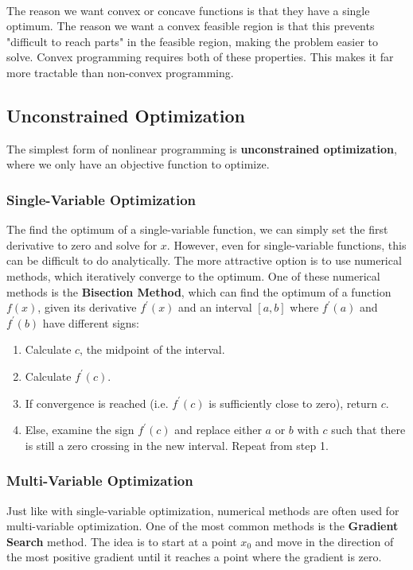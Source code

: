 \documentclass[12pt]{article}
\begin{document}
\noindent
\\
The reason we want convex or concave functions is that they have a single optimum.
The reason we want a convex feasible region is that this prevents "difficult to reach parts" in the feasible region, making the problem easier to solve.
Convex programming requires both of these properties.
This makes it far more tractable than non-convex programming.

\subsection{Unconstrained Optimization}
The simplest form of nonlinear programming is \textbf{unconstrained optimization}, where we only have an objective function to optimize.

\subsubsection{Single-Variable Optimization}
The find the optimum of a single-variable function, we can simply set the first derivative to zero and solve for $x$.
However, even for single-variable functions, this can be difficult to do analytically.
The more attractive option is to use numerical methods, which iteratively converge to the optimum.
One of these numerical methods is the \textbf{Bisection Method}, which can find the optimum of a function $f(x)$, given its derivative $f^\prime(x)$ and an interval $[a, b]$ where $f^\prime(a)$ and $f^\prime(b)$ have different signs:

\begin{enumerate}
    \item Calculate $c$, the midpoint of the interval.
    \item Calculate $f^\prime(c)$.
    \item If convergence is reached (i.e. $f^\prime(c)$ is sufficiently close to zero), return $c$.
    \item Else, examine the sign $f^\prime(c)$ and replace either $a$ or $b$ with $c$ such that there is still a zero crossing in the new interval. Repeat from step 1.
\end{enumerate}

\newpage
\subsubsection{Multi-Variable Optimization}
Just like with single-variable optimization, numerical methods are often used for multi-variable optimization.
One of the most common methods is the \textbf{Gradient Search} method.
The idea is to start at a point $x_0$ and move in the direction of the most positive gradient until it reaches a point where the gradient is zero.
\end{document}
